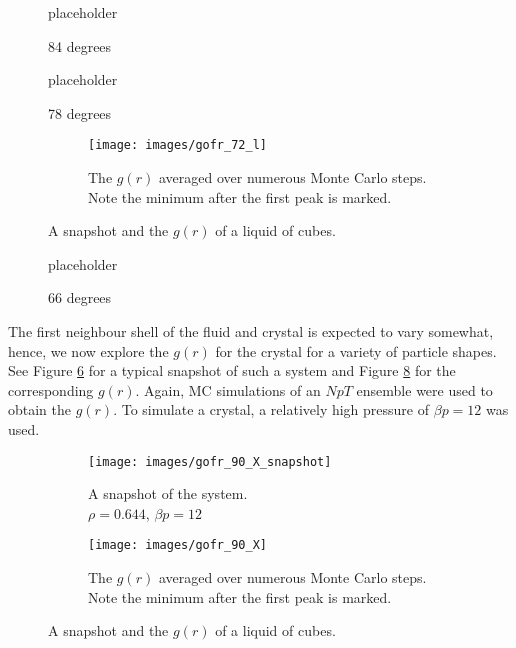 \documentclass[thesis]{subfiles}
\begin{document}
\begin{figure}[H]
	placeholder
	\caption{84 degrees} \label{fig:84}
\end{figure}
\begin{figure}[H]
	placeholder
	\caption{78 degrees} \label{fig:72}
\end{figure}
\begin{figure}[H]
	\centering
	\begin{subfigure}{0.5\textwidth}
		\centering
		\texttt{[image: images/gofr\_72\_l]}
		\caption{The $g(r)$ averaged over numerous Monte Carlo steps. Note the minimum after the first peak is marked.} \label{fig:g(r)72l}
	\end{subfigure}
	\caption{A snapshot and the $g(r)$ of a liquid of cubes.}
\end{figure}
\begin{figure}[H]
	placeholder
	\caption{66 degrees} \label{fig:66}
\end{figure}

The first neighbour shell of the fluid and crystal is expected to vary somewhat, hence, we now explore the $g(r)$ for the crystal for a variety of particle shapes. See Figure \ref{fig:g(r)90Xsnap} for a typical snapshot of such a system and Figure \ref{fig:g(r)90X} for the corresponding $g(r)$. Again, MC simulations of an $NpT$ ensemble were used to obtain the $g(r)$. To simulate a crystal, a relatively high pressure of $\beta p = 12$ was used.

\begin{figure}[H]
	\centering
	\begin{subfigure}{0.3\textwidth}
		\centering
		\vspace{8pt}
		\texttt{[image: images/gofr\_90\_X\_snapshot]}
		\vspace{10pt}
		\caption{A snapshot of the system.\\$\rho = 0.644$, $\beta p = 12$}  \label{fig:g(r)90Xsnap}
	\end{subfigure}
	\begin{subfigure}{0.5\textwidth}
		\centering
		\texttt{[image: images/gofr\_90\_X]}
		\caption{The $g(r)$ averaged over numerous Monte Carlo steps. Note the minimum after the first peak is marked.} \label{fig:g(r)90X}
	\end{subfigure}
	\caption{A snapshot and the $g(r)$ of a liquid of cubes.}
\end{figure}
\end{document}
